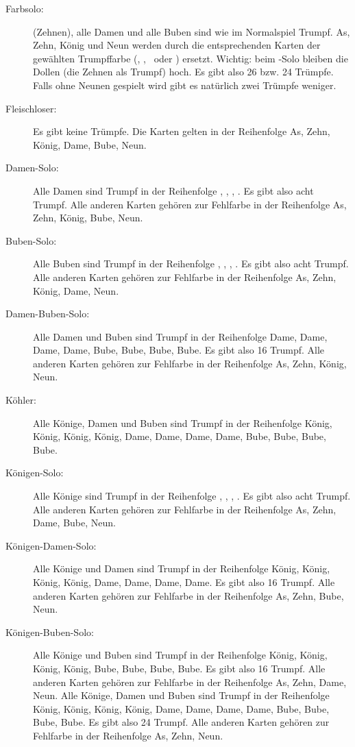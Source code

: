 \documentclass{scrartcl}
\begin{document}
\begin{description}
  \item[Farbsolo:]
    (\herz Zehnen), alle
    Damen und alle Buben sind wie im Normalspiel Trumpf. \karo As,
    \karo Zehn, \karo König und \karo Neun werden durch die
    entsprechenden Karten der gewählten Trumpffarbe (\kreuz, \pik,
    \herz\ oder \karo) ersetzt. Wichtig: beim \herz-Solo bleiben die
    Dollen (die \herz Zehnen als Trumpf) hoch. Es gibt also 26 bzw.
    24 Trümpfe. Falls ohne Neunen gespielt wird gibt es natürlich
    zwei Trümpfe weniger.
  \item[Fleischloser:]
    Es gibt keine Trümpfe. Die Karten gelten in der Reihenfolge As,
    Zehn, König, Dame, Bube, Neun.
  \item[Damen-Solo:]
    Alle Damen sind Trumpf in der Reihenfolge \kreuz, \pik, \herz,
    \karo. Es gibt also acht Trumpf. Alle anderen Karten gehören zur
    Fehlfarbe in der Reihenfolge As, Zehn, König, Bube, Neun.
  \item[Buben-Solo:]
    Alle Buben sind Trumpf in der Reihenfolge \kreuz, \pik, \herz,
    \karo. Es gibt also acht Trumpf. Alle anderen Karten gehören zur
    Fehlfarbe in der Reihenfolge As, Zehn, König, Dame, Neun.
  \item[Damen-Buben-Solo:]
    Alle Damen und Buben sind Trumpf in der Reihenfolge \kreuz Dame,
    \pik Dame, \herz Dame, \karo Dame, \kreuz Bube, \pik Bube, \herz
    Bube, \karo Bube. Es gibt also 16 Trumpf. Alle anderen Karten
    gehören zur Fehlfarbe in der Reihenfolge As, Zehn, König, Neun.
  \item[Köhler:]
    Alle Könige, Damen und Buben sind Trumpf in der Reihenfolge
    \kreuz König, \pik König, \herz König, \karo König,
    \kreuz Dame, \pik Dame, \herz Dame, \karo Dame,
    \kreuz Bube, \pik Bube, \herz Bube, \karo Bube.
  \item[Königen-Solo:]
    Alle Könige sind Trumpf in der Reihenfolge \kreuz, \pik, \herz,
    \karo. Es gibt also acht Trumpf. Alle anderen Karten gehören zur
    Fehlfarbe in der Reihenfolge As, Zehn, Dame, Bube, Neun.
  \item[Königen-Damen-Solo:]
    Alle Könige und Damen sind Trumpf in der Reihenfolge \kreuz
    König, \pik König, \herz König, \karo König, \kreuz Dame, \pik
    Dame, \herz Dame, \karo Dame. Es gibt also 16 Trumpf. Alle anderen
    Karten gehören zur Fehlfarbe in der Reihenfolge As, Zehn, Bube,
    Neun.
  \item[Königen-Buben-Solo:]
    Alle Könige und Buben sind Trumpf in der Reihenfolge \kreuz
    König, \pik König, \herz König, \karo König, \kreuz Bube, \pik
    Bube, \herz Bube, \karo Bube. Es gibt also 16 Trumpf. Alle anderen
    Karten gehören zur Fehlfarbe in der Reihenfolge As, Zehn, Dame,
    Neun. Alle Könige, Damen und Buben sind Trumpf in der Reihenfolge
    \kreuz König, \pik König, \herz König, \karo König, \kreuz
    Dame, \pik Dame, \herz Dame, \karo Dame, \kreuz Bube, \pik Bube,
    \herz Bube, \karo Bube. Es gibt also 24 Trumpf. Alle anderen
    Karten gehören zur Fehlfarbe in der Reihenfolge As, Zehn, Neun.
\end{description}
\end{document}
